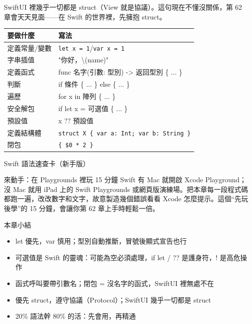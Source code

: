 SwiftUI 裡幾乎一切都是 struct（View 就是協議）。這句現在不懂沒關係，第 62 章會天天見面——在 Swift 的世界裡，先擁抱 struct。


\begin{center}
\begin{tabularx}{\linewidth}{|X|X|}
\hline
\textbf{要做什麼} & \textbf{寫法} \tabularnewline
\hline
定義常量/變數 & \texttt{let x = 1}/\texttt{var x = 1} \tabularnewline
字串插值 & "你好，\textbackslash{}(name)" \tabularnewline
定義函式 & func 名字(引數: 型別) -> 返回型別 \{ ... \} \tabularnewline
判斷 & if 條件 \{ ... \} else \{ ... \} \tabularnewline
遍歷 & for x in 陣列 \{ ... \} \tabularnewline
安全解包 & if let x = 可選值 \{ ... \} \tabularnewline
預設值 & x ?? 預設值 \tabularnewline
定義結構體 & \texttt{struct X \{ var a: Int; var b: String \}} \tabularnewline
閉包 & \texttt{\{ \$0 * 2 \}} \tabularnewline
\hline
\end{tabularx}
\end{center}

\begin{center}\small\color{gray}Swift 語法速查卡（新手版）\end{center}

\begin{tcbpractice}{來動手：在 Playgrounds 裡玩 15 分鐘 Swift}
有 Mac 就開啟 Xcode Playground；沒 Mac 就用 iPad 上的 Swift Playgrounds 或網頁版演練場。把本章每一段程式碼都跑一遍，改改數字和文字，故意製造幾個錯誤看看 Xcode 怎麼提示。這個“先玩後學”的 15 分鐘，會讓你第 62 章上手時輕鬆一倍。

\end{tcbpractice}

\begin{tcbsummary}{本章小結}
\begin{itemize}
  \item let 優先，var 慎用；型別自動推斷，冒號後顯式宣告也行
  \item 可選值是 Swift 的靈魂：可能為空必須處理，if let / ?? 是護身符，! 是高危操作
  \item 函式呼叫要帶引數名；閉包 = 沒名字的函式，SwiftUI 裡無處不在
  \item 優先 struct，遵守協議（Protocol）；SwiftUI 幾乎一切都是 struct
  \item 20\% 語法幹 80\% 的活：先會用，再精通
\end{itemize}

\end{tcbsummary}
